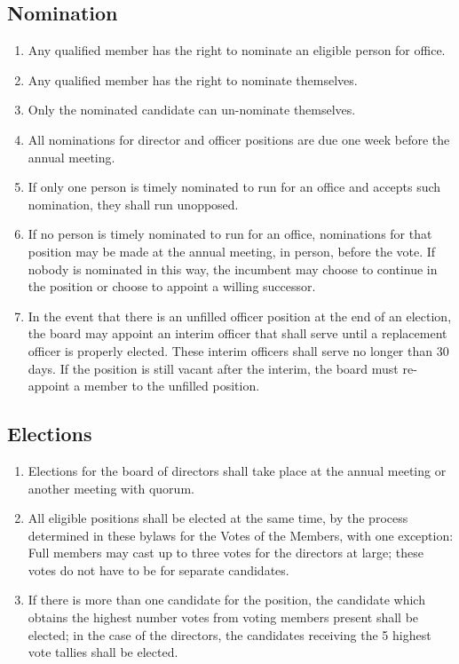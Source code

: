 \documentclass{article}
\begin{document}
\subsection{Nomination}
\begin{enumerate}
\item Any qualified member has the right to nominate an eligible person for office.
\item Any qualified member has the right to nominate themselves.
\item Only the nominated candidate can un-nominate themselves.
\item All nominations for director and officer positions are due one week before the annual 
meeting.
\item If only one person is timely nominated to run for an office and accepts such 
nomination, they shall run unopposed.
\item If no person is timely nominated to run for an office, nominations for that position 
may be made at the annual meeting, in person, before the vote. If nobody is nominated in 
this way, the incumbent may choose to continue in the position or choose to appoint a 
willing successor.
\item In the event that there is an unfilled officer position at the end of an election, the 
board may appoint an interim officer that shall serve until a replacement officer is properly 
elected. These interim officers shall serve no longer than 30 days. If the position is still 
vacant after the interim, the board must re-appoint a member to the unfilled position.
\end{enumerate}
\subsection{Elections}
\begin{enumerate}
\item Elections for the board of directors shall take place at the annual meeting or another 
meeting with quorum.
\item All eligible positions shall be elected at the same time, by the process determined in 
these bylaws for the Votes of the Members, with one exception:  Full members may cast up 
to three votes for the directors at large;  these votes do not have to be for separate 
candidates.
\item If there is more than one candidate for the position, the candidate which obtains the 
highest number votes from voting members present shall be elected;  in the case of the 
directors, the candidates receiving the 5 highest vote tallies shall be elected.
\end{enumerate}
\end{document}
